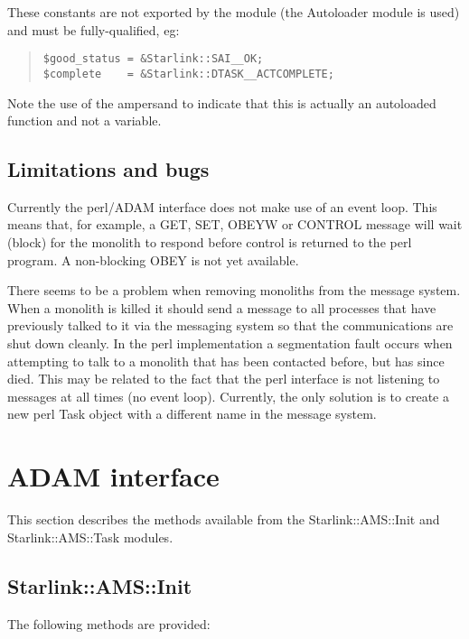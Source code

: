 \documentclass[twoside,11pt]{article}
\newenvironment{myquote}{\begin{quote}\begin{small}}{\end{small}\end{quote}}
\renewcommand{\_}{\texttt{\symbol{95}}}
\begin{document}
These constants are not exported by the module (the Autoloader module is used) 
and must be fully-qualified, eg:

\begin{myquote}
\begin{verbatim}
$good_status = &Starlink::SAI__OK;
$complete    = &Starlink::DTASK__ACTCOMPLETE;
\end{verbatim}
\end{myquote}

Note the use of the ampersand to indicate that this is actually an
autoloaded function and not a variable.


\subsection{Limitations and bugs}

Currently the perl/ADAM interface does not make use of an event loop.
This means that, for example, a GET, SET, OBEYW or CONTROL message will
wait (block) for the monolith to respond before control is returned
to the perl program. A non-blocking OBEY is not yet available.

There seems to be a problem when removing monoliths from the message
system. When a monolith is killed it should send a message to 
all processes that have previously talked to it via the messaging
system so that the communications are shut down cleanly. In the perl
implementation a segmentation fault occurs when attempting to talk
to a monolith that has been contacted before, but has since died.
This may be related to the fact that the perl interface is not
listening to messages at all times (no event loop). Currently, the
only solution is to create a new perl Task object with a different
name in the message system.


\appendix


\section{ADAM interface}

This section describes the methods available from the Starlink::AMS::Init
and Starlink::AMS::Task modules.

\subsection{Starlink::AMS::Init}

The following methods are provided:
\end{document}
